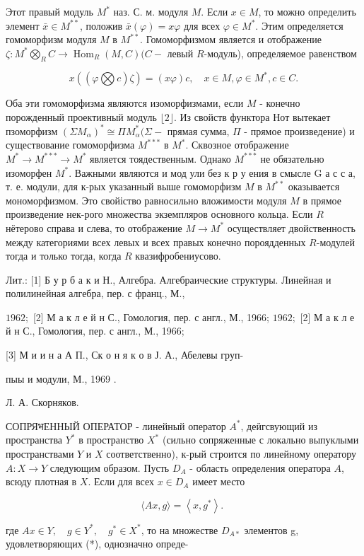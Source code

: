 \documentclass[10pt]{article}
\begin{document}
Этот правый модуль $M^{*}$ наз. С. м. модуля $M$. Если $x \in M$, то можно определить элемент $\bar{x} \in M^{* *}$, положив $\bar{x}(\varphi)=x \varphi$ для всех $\varphi \in M^{*}$. Этим определяется гомоморфизм модуля $M$ в $M^{* *}$. Гомоморфизмом является и отображение $\zeta: M^{*} \bigotimes_{R} C \rightarrow \operatorname{Hom}_{R}(M, C)(C-$ левый $R$-модуль), определяемое равенством



\[

x((\varphi \bigotimes c) \zeta)=(x \varphi) c, \quad x \in M, \varphi \in M^{*}, c \in C .

\]



Оба эти гомоморфизма являются изоморфизмами, если $M$ - конечно порожденный проективный модуль $\lfloor 2\rfloor$. Из свойств функтора Нот вытекает пзоморфизм $\left(\Sigma M_{\alpha}\right)^{*} \cong \Pi M_{\alpha}^{*}(\Sigma-$ прямая сумма, $\Pi$ - прямое произведение) и существование гомоморфизма $M^{* * *}$ в $M^{*}$. Сквозное отображение $M^{*} \rightarrow M^{* * *} \rightarrow M^{*}$ является тоядественным. Однако $M^{* * *}$ не обязательно изоморфен $M^{*}$. Важными являются и мод ули без к р у ения в смысле $\mathrm{G}$ а с с а, т. е. модули, для к-рых указанный выше гомоморфизм $M$ в $M^{* *}$ оказывается мономорфизмом. Это свойіство равносильно вложимости модуля $M$ в прямое произведение нек-рого множества экземпляров основного кольца. Если $R$ нётерово справа и слева, то отображение $M \rightarrow M^{*}$ осуществляет двойственность между категориями всех левых и всех правых конечно пороядденных $R$-модулей тогда и только тогда, когда $R$ квазифробениусово.



Лит.: [1] Б у р б а к и Н., Алгебра. Алгебраические структуры. Линейная и полилинейная алгебра, пер. с франц., М.,

$1962 ;$ [2] М а к л е й н С., Гомология, пер. с англ., М., 1966; $1962 ;$ [2] М а к л е й н С., Гомология, пер. с англ., М., 1966;

[3] М и и н а А П., Ск о н я к о в Ј. А., Абелевы груп-

пыы и модули, М., 1969 .

Л. А. Скорняков.



СОПРЯभЕННЫЙ ОПЕРАТОР - линейный оператор $A^{*}$, деӥгсвующий из пространства $Y^{*}$ в пространство $X^{*}$ (сильно сопряженные с локально выпуклыми пространствами $Y$ и $X$ соответственно), к-рый строится по линейному оператору $A: X \rightarrow Y$ следующим образом. Пусть $D_{A}$ - область определения оператора $A$, всюду плотная в $X$. Если для всех $x \in D_{A}$ имеет место



\[

\langle A x, g\rangle=\left\langle x, g^{*}\right\rangle \text {. }

\]



где $A x \in Y, \quad g \in Y^{*}, \quad g^{*} \in X^{*}$, то на множестве $D_{A *}$ элементов g, удовлетворяющих (*), однозначно опреде-
\end{document}
